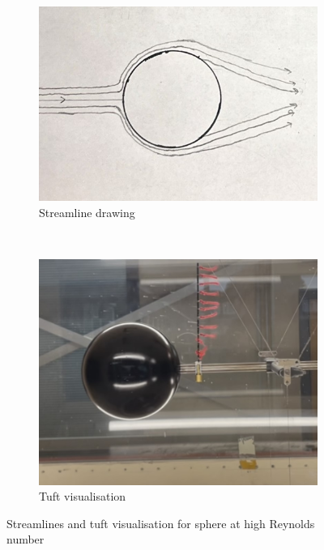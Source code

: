 \documentclass[8pt]{article}
\begin{document}
\begin{figure}[H]
    \centering
    \begin{subfigure}[t]{0.48\textwidth}
        \centering
        \includegraphics[width=1\textwidth]{Images_Videos/stream_hi_Re_sphere.jpg}
        \caption{Streamline drawing}
        \label{fig:figure8}
    \end{subfigure}
    ~
    \begin{subfigure}[t]{0.48\textwidth}
        \centering
        \includegraphics[width=1\textwidth]{Images_Videos/sphere_high_Re.jpg}
        \caption{Tuft visualisation}
        \label{fig:figure9}
    \end{subfigure}
    \caption{Streamlines and tuft visualisation for sphere at high Reynolds number}
\end{figure}
\end{document}

